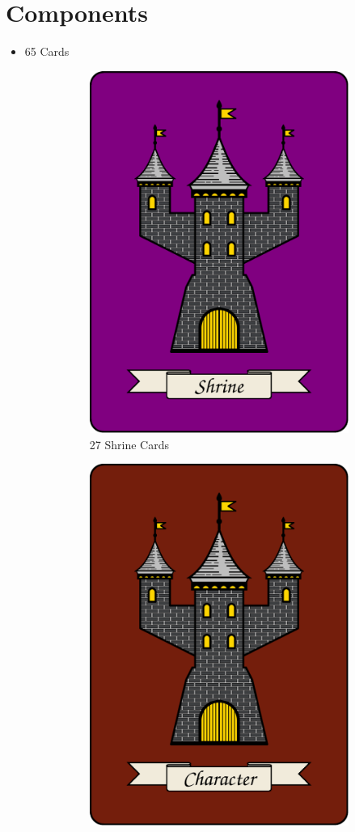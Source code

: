 \documentclass[10pt, parskip=half-, twoside]{scrartcl}
\begin{document}
\section*{Components}
\begin{itemize}[itemindent=*, leftmargin=*]
\item 65 Cards
	\begin{figure}[H]
	\centering
	\begin{subfigure}{0.4\textwidth}
	\centering
		\includegraphics[scale=0.1]{Images/shrine_card_back.pdf}
	\caption*{27 Shrine Cards}
	\end{subfigure}
	\qquad
	\begin{subfigure}{0.4\textwidth}
	\centering
		\includegraphics[scale=0.1]{Images/character_card_back.pdf}

\end{subfigure}
\end{figure}
\end{itemize}
\end{document}
